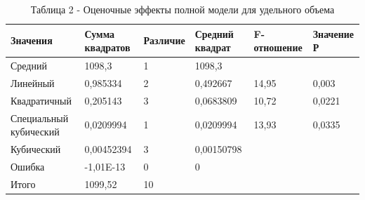\begin{table}[H]
\caption*{Таблица 2 - Оценочные эффекты полной модели для удельного объема}
\centering
\begin{tabular}{|l|l|l|l|l|l|}
\hline
Значения               & Сумма квадратов & Различие & Средний квадрат & F-отношение & Значение Р \\ \hline
Средний                & 1098,3          & 1        & 1098,3          &             &            \\ \hline
Линейный               & 0,985334        & 2        & 0,492667        & 14,95       & 0,003      \\ \hline
Квадратичный           & 0,205143        & 3        & 0,0683809       & 10,72       & 0,0221     \\ \hline
\begin{minipage}{2.5cm}Специальный кубический\end{minipage} & 0,0209994       & 1        & 0,0209994       & 13,93       & 0,0335     \\ \hline
Кубический             & 0,00452394      & 3        & 0,00150798      &             &            \\ \hline
Ошибка                 & -1,01E-13       & 0        & 0               &             &            \\ \hline
Итого                  & 1099,52         & 10       &                 &             &            \\ \hline
\end{tabular}
\end{table}

